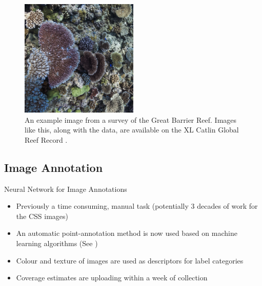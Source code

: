 \documentclass{beamer}
\begin{document}
            \begin{frame}
                \begin{figure}
                    \centering
                    \includegraphics[width = 0.5\textwidth]{coral.jpg}
                    \caption{An example image from a survey of the Great Barrier Reef. Images like this, along with the data, are available on the XL Catlin Global Reef Record \cite{GRR}.}
                \end{figure}
            \end{frame}

          \subsection{Image Annotation}
              \begin{frame}{Neural Network for Image Annotations}
                \begin{itemize}
                  \item Previously a time consuming, manual task (potentially 3 decades of work for the CSS images)
                  \item An automatic point-annotation method is now used based on machine learning algorithms (See \cite{Beijbom2015})
                  \item Colour and texture of images are used as descriptors for label categories
                  \item Coverage estimates are uploading within a week of collection
                \end{itemize}
              \end{frame}
\end{document}
